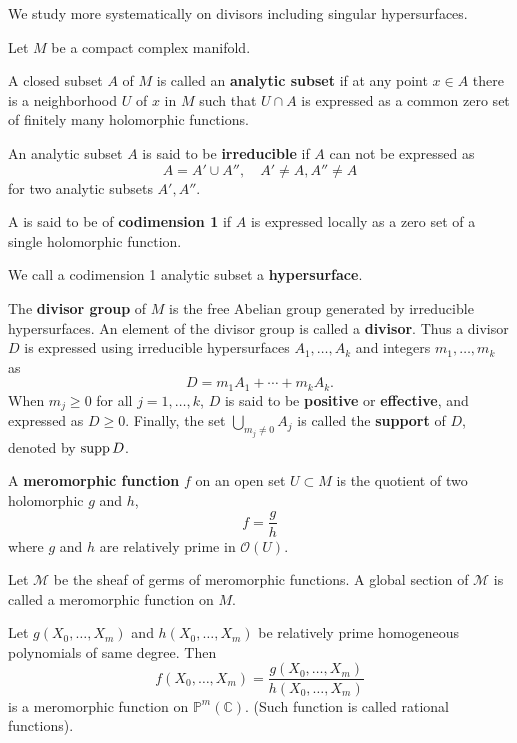 \documentclass[12pt]{article}
\begin{document}
We study more systematically on divisors including singular hypersurfaces.

Let \(M\) be a compact complex manifold.
\begin{definition}
  A closed subset \(A\) of \(M\) is called an \textbf{analytic subset} if at any
  point \(x\in A\) there is a neighborhood \(U\) of \(x\) in \(M\) such that
  \(U\cap A\) is expressed as a common zero set of finitely many holomorphic functions.
\end{definition}
\begin{definition}
  An analytic subset \(A\) is said to be \textbf{irreducible} if \(A\) can not be
  expressed as \[
    A=A'\cup A'',\quad A'\neq A,A''\neq A
  \] for two analytic subsets \(A',A''\).
\end{definition}
\begin{definition}
  A is said to be of \textbf{codimension 1} if \(A\) is expressed locally as a zero
  set of a single holomorphic function.
\end{definition}
\begin{definition}
  We call a codimension 1 analytic subset a \textbf{hypersurface}.
\end{definition}
\begin{definition}
  The \textbf{divisor group} of \(M\) is the free Abelian group generated by
  irreducible hypersurfaces. An element of the divisor group is called a
  \textbf{divisor}. Thus a divisor \(D\) is expressed using irreducible hypersurfaces
  \(A_1,\ldots,A_k\) and integers \(m_1,\ldots,m_k\) as \[
    D=m_1 A_1+\cdots +m_k A_k
  .\] When \(m_j\ge 0\) for all \(j=1,\ldots,k\), \(D\) is said to be \textbf{positive}
  or \textbf{effective}, and expressed as \(D\ge 0\). Finally,
  the set \(\bigcup_{m_j\neq 0}A_j\) is called the \textbf{support} of \(D\), denoted
  by \(\operatorname{supp}D\).
\end{definition}
\begin{definition}
  A \textbf{meromorphic function} \(f\) on an open set \(U\subset M\) is the quotient
  of two holomorphic \(g\) and \(h\), \[
    f=\frac{g}{h}
  \] where \(g\) and \(h\) are relatively prime in \(\mathcal{O}(U)\).

  Let \(\mathscr{M}\) be the sheaf of germs of meromorphic functions. A global section
  of \(\mathscr{M}\) is called a meromorphic function on \(M\).
\end{definition}
\begin{example}
  Let \(g(X_0,\ldots,X_m)\) and \(h(X_0,\ldots,X_m)\) be relatively prime homogeneous
  polynomials of same degree. Then \[
    f(X_0,\ldots,X_m)=\frac{g(X_0,\ldots,X_m)}{h(X_0,\ldots,X_m)}
  \] is a meromorphic function on \(\mathbb{P}^m(\mathbb{C})\). (Such function is
  called rational functions).
\end{example}
\end{document}
